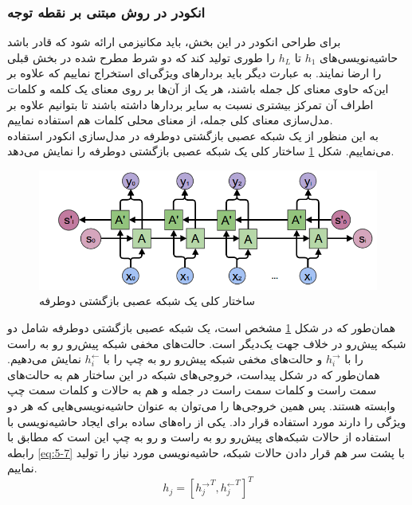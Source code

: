 \subsubsection{انکودر در روش مبتنی بر نقطه توجه}
برای طراحی انکودر در این بخش، باید مکانیزمی ارائه شود که قادر باشد حاشیه‌نویسی‌های $h_1$ تا $h_L$ را طوری تولید کند که دو شرط مطرح شده در بخش قبلی را ارضا نمایند. به عبارت دیگر باید بردارهای ویژگی‌ای استخراج نماییم که علاوه بر این‌که حاوی معنای کل جمله باشند، هر یک از آن‌ها بر روی معنای یک کلمه و کلمات اطراف آن تمرکز بیشتری نسبت به سایر بردارها داشته باشند تا بتوانیم علاوه بر مدل‌سازی معنای کلی جمله، از معنای محلی کلمات هم استفاده نماییم.
\\
به این منظور از یک شبکه عصبی بازگشتی دوطرفه در مدل‌سازی انکودر استفاده می‌نماییم. شکل \ref{fig:biencoder} ساختار کلی یک شبکه عصبی بازگشتی دوطرفه را نمایش می‌دهد. 

\begin{figure}[h]
\centering
\includegraphics[scale=0.6]{Imgs/biencoder.png}
\caption{ساختار کلی یک شبکه عصبی بازگشتی دوطرفه}
\label{fig:biencoder}
\end{figure}

همان‌طور که در شکل \ref{fig:biencoder} مشخص است، یک شبکه عصبی بازگشتی دوطرفه شامل دو شبکه پیش‌رو در خلاف جهت یک‌دیگر است. حالت‌های مخفی شبکه پیش‌رو رو به راست را با $h_i^\rightarrow$ و حالت‌های مخفی شبکه پیش‌رو رو به چپ را با $h_i^\leftarrow$ نمایش می‌دهیم. همان‌طور که در شکل پیداست، خروجی‌های شبکه در این ساختار هم به حالت‌های سمت راست و کلمات سمت راست در جمله و هم به حالات و کلمات سمت چپ وابسته هستند. پس همین خروجی‌ها را می‌توان به عنوان حاشیه‌نویسی‌هایی که هر دو ویژگی را دارند مورد استفاده قرار داد.
	یکی از راه‌های ساده برای ایجاد حاشیه‌نویسی با استفاده از حالات شبکه‌های پیش‌رو رو به راست و رو به چپ این است که مطابق با رابطه \eqref{eq:5-7} با پشت سر هم قرار دادن حالات شبکه، حاشیه‌نویسی مورد نیاز را تولید نماییم.
	\begin{equation}
	h_j = [{h_j^\rightarrow}^T, {h_j^\leftarrow}^T]^T
	\label{eq:5-7}
	\end{equation}



